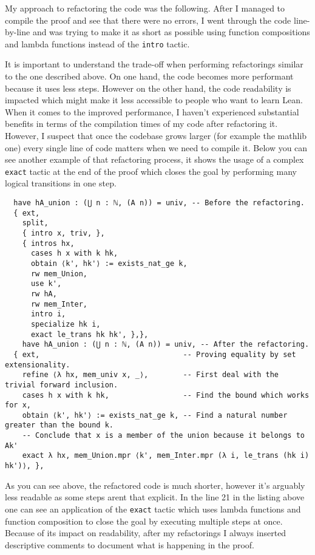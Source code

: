 \documentclass[11pt]{article}
\newenvironment{code}{\captionsetup{type=listing}}{}
\begin{document}
My approach to refactoring the code was the following. After I managed to compile the proof
and see that there were no errors, I went through the code line-by-line and was
trying to make it as short as possible using function compositions and lambda
functions instead of the \texttt{intro} tactic.

It is important to understand the trade-off when performing refactorings similar to
the one described above. On one hand, the code becomes more performant because it
uses less steps. However on the other hand, the code readability is impacted which
might make it less accessible to people who want to learn Lean. When it comes to the
improved performance, I haven't experienced substantial benefits in terms of the
compilation times of my code after refactoring it. However, I suspect that once
the codebase grows larger (for example the mathlib one) every single line of
code matters when we need to compile it. Below you can see another example of that
refactoring process, it shows the usage of a complex \texttt{exact} tactic at
the end of the proof which closes the goal by performing many logical transitions
in one step.

\begin{code}
\begin{verbatim}
  have hA_union : (⋃ n : ℕ, (A n)) = univ, -- Before the refactoring.
  { ext,
    split,
    { intro x, triv, },
    { intros hx,
      cases h x with k hk,
      obtain ⟨k', hk'⟩ := exists_nat_ge k,
      rw mem_Union,
      use k',
      rw hA,
      rw mem_Inter,
      intro i,
      specialize hk i,
      exact le_trans hk hk', },},
    have hA_union : (⋃ n : ℕ, (A n)) = univ, -- After the refactoring.
  { ext,                                 -- Proving equality by set extensionality.
    refine ⟨λ hx, mem_univ x, _⟩,        -- First deal with the trivial forward inclusion.
    cases h x with k hk,                 -- Find the bound which works for x,
    obtain ⟨k', hk'⟩ := exists_nat_ge k, -- Find a natural number greater than the bound k.
    -- Conclude that x is a member of the union because it belongs to Ak'
    exact λ hx, mem_Union.mpr ⟨k', mem_Inter.mpr (λ i, le_trans (hk i)  hk')⟩, },
\end{verbatim}
\end{code}

As you can see above, the refactored code is much shorter, however it's arguably
less readable as some steps arent that explicit. In the line 21 in the listing above
one can see an application of the \texttt{exact} tactic which uses lambda functions
and function composition to close the goal by executing multiple steps at once.
Because of its impact on readability, after my refactorings
I always inserted descriptive comments to document what is happening in the proof.
\end{document}
